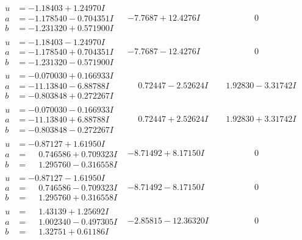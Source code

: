 \documentclass[1p]{elsarticle_modified}
\theoremstyle{definition}
\begin{document}
$$\begin{array}{c|c|c}
\begin{aligned}
u &= -1.18403 + 1.24970 I \\
a &= -1.178540 - 0.704351 I \\
b &= -1.231320 + 0.571900 I\end{aligned}
 & -7.7687 + 12.4276 I & \phantom{-0.000000 } 0 \\ \hline\begin{aligned}
u &= -1.18403 - 1.24970 I \\
a &= -1.178540 + 0.704351 I \\
b &= -1.231320 - 0.571900 I\end{aligned}
 & -7.7687 - 12.4276 I & \phantom{-0.000000 } 0 \\ \hline\begin{aligned}
u &= -0.070030 + 0.166933 I \\
a &= -11.13840 - 6.88788 I \\
b &= -0.803848 + 0.272267 I\end{aligned}
 & \phantom{-}0.72447 - 2.52624 I & \phantom{-}1.92830 - 3.31742 I \\ \hline\begin{aligned}
u &= -0.070030 - 0.166933 I \\
a &= -11.13840 + 6.88788 I \\
b &= -0.803848 - 0.272267 I\end{aligned}
 & \phantom{-}0.72447 + 2.52624 I & \phantom{-}1.92830 + 3.31742 I \\ \hline\begin{aligned}
u &= -0.87127 + 1.61950 I \\
a &= \phantom{-}0.746586 + 0.709323 I \\
b &= \phantom{-}1.295760 - 0.316558 I\end{aligned}
 & -8.71492 + 8.17150 I & \phantom{-0.000000 } 0 \\ \hline\begin{aligned}
u &= -0.87127 - 1.61950 I \\
a &= \phantom{-}0.746586 - 0.709323 I \\
b &= \phantom{-}1.295760 + 0.316558 I\end{aligned}
 & -8.71492 - 8.17150 I & \phantom{-0.000000 } 0 \\ \hline\begin{aligned}
u &= \phantom{-}1.43139 + 1.25692 I \\
a &= \phantom{-}1.002340 - 0.497305 I \\
b &= \phantom{-}1.32751 + 0.61186 I\end{aligned}
 & -2.85815 - 12.36320 I & \phantom{-0.000000 } 0\\

\end{array}$$
\end{document}
